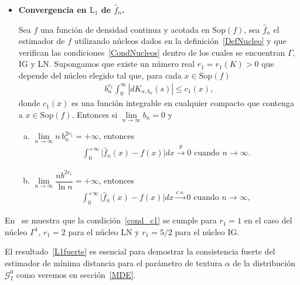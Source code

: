 \begin{itemize}
\item \textbf{Convergencia en $\text{L}_1$ de $\widehat{f}_n$.}

\begin{theorem}
	\label{ConvergenciaFuerte}
	\bigskip
	Sea $f$ una función de densidad continua y acotada en $\mathrm{Sop}(f)$, sea $\widehat{f}_{n}$ el estimador de $f$ utilizando núcleos dados en la definición~\ref{DefNucleo} y que verifican las condiciones~\ref{CondNucleos} dentro de los cuales se encuentran $\Gamma$, IG y LN. Supongamos que existe un número real $r_1=r_1(K)>0$ que depende del núcleo elegido tal que, para cada $x \in \mathrm{Sop}(f)$ 
	\begin{align}
	\label{cond_c1}
	b_n^{r_1} \displaystyle{\int_0^{\infty}} | dK_{x,b_n}(s) | \leq c_1(x),
	\end{align}
	donde $c_1(x)$ es una función integrable en cualquier compacto que contenga a $x \in \mathrm{Sop}(f)$. Entonces si $\lim\limits_{n \rightarrow \infty} b_n=0 $ y
	\begin{enumerate}[a)]
		\item $\lim\limits_{n \rightarrow \infty} n \, b_n^{2r_1}=+\infty$,  entonces
		\begin{align}
		\int_0^{+\infty} \vert \widehat{f}_n(x)-f(x)\vert dx \stackrel{p} {\longrightarrow} 0 \text{ cuando } n \longrightarrow \infty.
		\label{L1debil}
		\end{align}
		\item $\lim\limits_{n \to \infty} \dfrac{n b^{2r_1}}{\ln{n}}  = +\infty $, entonces 
		\begin{align}
		\int_0^{+\infty} \vert \widehat{f}_n(x)-f(x)\vert dx \stackrel{c.s.} {\longrightarrow} 0 \text{ cuando } n \longrightarrow \infty,
		\label{L1fuerte}
		\end{align}
	\end{enumerate}
\end{theorem}

\end{itemize}

En~\cite{Libnegue2013} se muestra que la condición~\ref{cond_c1} se cumple para $r_1=1$ en el caso del núcleo $\Gamma^1$, $r_1=2$ para el núcleo LN y $r_1=5/2$ para el núcleo IG.

El resultado~\ref{L1fuerte} es esencial para demostrar la consistencia fuerte del estimador de mínima distancia para el parámetro de textura $\alpha$ de la distribución $\mathcal{G}_I^0$ como veremos en sección~\ref{MDE}.

